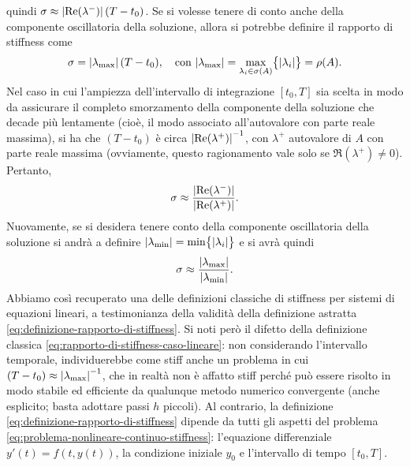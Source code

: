 quindi $\sigma \approx \left\lvert\operatorname{Re}(\lambda^-)\right\rvert(T-t_0)$.
Se si volesse tenere di conto anche della componente oscillatoria della soluzione,
allora si potrebbe definire il rapporto di stiffness come
\[
\sigma = \left\lvert\lambda_{\text{max}}\right\rvert(T-t_0),
\quad \text{con $\left\lvert\lambda_{\text{max}}\right\rvert
	= \max_{\lambda_i \in \sigma(A)} \bigl\lbrace \left\lvert\lambda_i\right\rvert \bigr\rbrace
	= \rho(A)$}.
\]
Nel caso in cui l'ampiezza dell'intervallo di integrazione $[t_0,T]$ sia scelta
in modo da assicurare il completo smorzamento della componente della soluzione
che decade più lentamente (cioè, il modo associato all'autovalore con parte
reale massima), si ha che $(T-t_0)$ è circa $\left\lvert\operatorname{Re}(\lambda^+)\right\rvert^{-1}$,
con $\lambda^+$ autovalore di $A$ con parte reale massima (ovviamente,
questo ragionamento vale solo se $\Re(\lambda^+) \neq 0$). Pertanto,
\[
\sigma \approx \frac{\left\lvert\operatorname{Re}(\lambda^-)\right\rvert}{\left\lvert\operatorname{Re}(\lambda^+)\right\rvert}.
\]
Nuovamente, se si desidera tenere conto della componente oscillatoria
della soluzione si andrà a definire
$\left\lvert\lambda_{\text{min}}\right\rvert = \min \bigl\lbrace \left\lvert\lambda_i\right\rvert \bigr\rbrace$
e si avrà quindi
\begin{equation} \label{eq:rapporto-di-stiffness-caso-lineare}
\sigma \approx \frac{\left\lvert\lambda_{\text{max}}\right\rvert}{\left\lvert\lambda_{\text{min}}\right\rvert}.
\end{equation}
Abbiamo così recuperato una delle definizioni classiche di stiffness
per sistemi di equazioni lineari, a testimonianza della validità della
definizione astratta \eqref{eq:definizione-rapporto-di-stiffness}.
Si noti però il difetto della definizione classica
\eqref{eq:rapporto-di-stiffness-caso-lineare}: non considerando l'intervallo
temporale, individuerebbe come stiff anche un problema in cui
$(T-t_0) \approx \left\lvert\lambda_{\text{max}}\right\rvert^{-1}$, che in realtà non è affatto stiff
perché può essere risolto in modo stabile ed efficiente da qualunque metodo
numerico convergente (anche esplicito; basta adottare passi $h$ piccoli).
Al contrario, la definizione \eqref{eq:definizione-rapporto-di-stiffness}
dipende da tutti gli aspetti del problema
\eqref{eq:problema-nonlineare-continuo-stiffness}: l'equazione differenziale
$y'(t) = f(t,y(t))$, la condizione iniziale $y_0$ e l'intervallo di tempo $[t_0,T]$.

